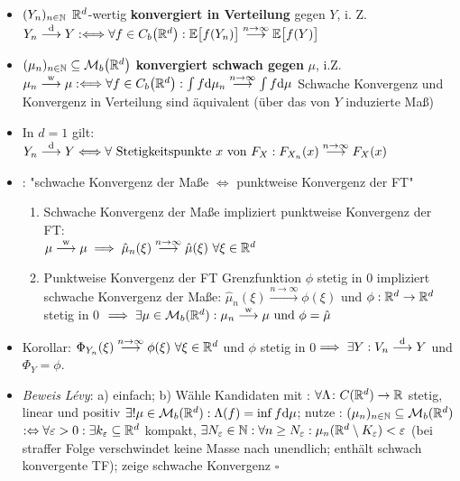 \documentclass[12pt]{scrartcl}
\begin{document}
	\begin{itemize}
		\item $(Y_n)_{n\in\mathbb{N}}$ $\mathbb{R}^d$-wertig \textbf{konvergiert in Verteilung} gegen $Y$, i. Z.
		$
		Y_n\overset{\mathrm{d}}{\longrightarrow}Y
		:\Longleftrightarrow\forall f\in C_b\big(\mathbb{R}^d\big):
		\mathbb{E}\big[f(Y_n)\big]\overset{n\to\infty}{\longrightarrow}\mathbb{E}\big[f(Y)\big]
		$
		\item $(\mu_n)_{n\in\mathbb{N}}\subseteq\mathcal{M}_b\big(\mathbb{R}^d\big)$ \textbf{konvergiert schwach gegen} $\mu$, i.Z.
		$
		\mu_n\overset{\text{w}}{\longrightarrow}\mu 
		:\Longleftrightarrow\forall f\in C_b\big(\mathbb{R}^d\big):\int\limits f\mathrm{d}\mu_n\overset{n\to\infty}{\longrightarrow}\int\limits f\mathrm{d}\mu 
		$
		Schwache Konvergenz und Konvergenz in Verteilung sind äquivalent (über das von $Y$ induzierte Maß)
		\item In $d=1$ gilt: $Y_n\overset{\mathrm{d}}{\longrightarrow}Y
			\Longleftrightarrow\forall\text{ Stetigkeitspunkte $x$ von }F_X:
			F_{X_n}(x)\overset{n\to\infty}{\longrightarrow} F_X(x)
		$
		\item {}: "schwache Konvergenz der Maße $\Longleftrightarrow$ punktweise Konvergenz der FT"
		\begin{enumerate}
			\item Schwache Konvergenz der Maße impliziert punktweise Konvergenz der FT:\\
			$\mu\overset{\text{w}}{\longrightarrow}\mu\implies\hat{\mu}_n(\xi)\overset{n\to\infty}{\longrightarrow}\hat{\mu}(\xi)~\forall\xi\in\mathbb{R}^d$
			\item Punktweise Konvergenz der FT  Grenzfunktion $\phi$ stetig in 0 impliziert schwache Konvergenz der Maße: $\hat{\mu}_n(\xi)\overset{n\to\infty}{\longrightarrow}\phi(\xi)$ und $\phi:\mathbb{R}^d\to\mathbb{R}^d$ stetig in 0 $\implies\exists\mu\in\mathcal{M}_b(\mathbb{R}^d):\mu_n\overset{\text{w}}{\longrightarrow}\mu\text{ und }\phi=\hat{\mu}$
		\end{enumerate}
		\item Korollar: $\Phi_{Y_n}(\xi)\overset{n\to\infty}{\longrightarrow}\phi(\xi)~\forall\xi\in\mathbb{R}^d$ und $\phi$ stetig in 0$\implies\exists Y:V_n\overset{\mathrm{d}}{\longrightarrow}Y$ und $\Phi_Y=\phi$.
		\item \textit{Beweis Lévy}: a) einfach; b) 
		Wähle Kandidaten mit :
		$\forall\Lambda\colon C(\mathbb{R}^d)\to\mathbb{R}$ stetig, linear und positiv $\exists!\mu\in\mathcal{M}_b(\mathbb{R}^d):\Lambda(f)=\inf f\mathrm{d}\mu$;
		nutze :
		$(\mu_n)_{n\in\mathbb{N}}\subseteq\mathcal{M}_b(\mathbb{R}^d)$  $:\Leftrightarrow\forall\varepsilon>0:\exists k_\varepsilon\subseteq\mathbb{R}^d$ kompakt, $\exists N_\varepsilon\in\mathbb{N}:\forall n\geq N_\varepsilon:\mu_n(\mathbb{R}^d\setminus K_\varepsilon)<\varepsilon$	
		(bei straffer Folge verschwindet keine Masse nach unendlich; enthält schwach konvergente TF); zeige schwache Konvergenz $\square$
	\end{itemize}
	
\end{document}
